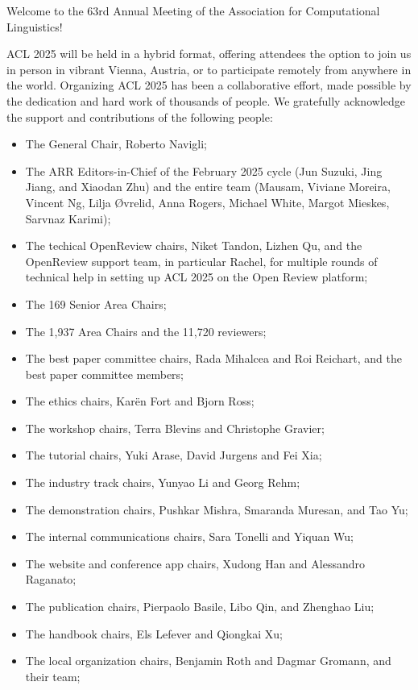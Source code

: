 Welcome to the 63rd Annual Meeting of the Association for Computational Linguistics!

ACL 2025 will be held in a hybrid format, offering attendees the option to join us in person in vibrant Vienna, Austria, or to participate remotely from anywhere in the world. Organizing ACL 2025 has been a collaborative effort, made possible by the dedication and hard work of thousands of people. We gratefully acknowledge the support and contributions of the following people:

\begin{itemize}
\item The General Chair, Roberto Navigli;
\item The ARR Editors-in-Chief of the February 2025 cycle (Jun Suzuki, Jing Jiang, and Xiaodan Zhu) and the entire team (Mausam, Viviane Moreira, Vincent Ng, Lilja Øvrelid, Anna Rogers, Michael White, Margot Mieskes, Sarvnaz Karimi);
\item The techical OpenReview chairs, Niket Tandon, Lizhen Qu, and the OpenReview support team, in particular Rachel, for multiple rounds of technical help in setting up ACL 2025 on the Open Review platform;
\item The 169 Senior Area Chairs;
\item The 1,937 Area Chairs and the 11,720  reviewers; 
\item The best paper committee chairs, Rada Mihalcea and Roi Reichart, and the best paper committee members; 
\item The ethics chairs, Karën Fort and Bjorn Ross; 
\item The workshop chairs, Terra Blevins and Christophe Gravier;
\item The tutorial chairs, Yuki Arase, David Jurgens and Fei Xia;
\item The industry track chairs, Yunyao Li and Georg Rehm;
\item The demonstration chairs, Pushkar Mishra, Smaranda Muresan, and Tao Yu;
\item The internal communications chairs, Sara Tonelli and Yiquan Wu;
\item The website and conference app chairs, Xudong Han and Alessandro Raganato; 
\item The publication chairs, Pierpaolo Basile, Libo Qin, and Zhenghao Liu;
\item The handbook chairs, Els Lefever and Qiongkai Xu;
\item The local organization chairs, Benjamin Roth and Dagmar Gromann, and their team;

\end{itemize}
